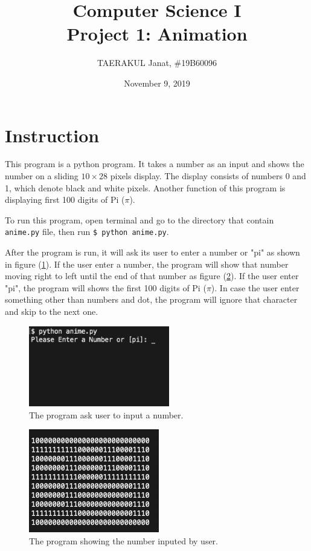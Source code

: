 \documentclass[12pt]{article}
\title{Computer Science I \\Project 1: Animation}
\author{TAERAKUL Janat, \#19B60096}
\date{November 9, 2019}
\begin{document}

\maketitle

\section{Instruction}\label{sec:instr}

	This program is a python program. It takes a number as an input and shows the number on a sliding $10 \times 28$ pixels display. The display consists of numbers 0 and 1, which denote black and white pixels. Another function of this program is displaying first 100 digits of Pi ($\pi$). 

	To run this program, open terminal and go to the directory that contain \texttt{anime.py} file, then run \texttt{\$ python anime.py}.

	After the program is run, it will ask its user to enter a number or "pi" as shown in figure (\ref{fig:runProg}). If the user enter a number, the program will show that number moving right to left until the end of that number as figure (\ref{fig:runningProg}). If the user enter "pi", the program will shows the first 100 digits of Pi ($\pi$). In case the user enter something other than numbers and dot, the program will ignore that character and skip to the next one.

	\begin{figure}[ht]
		\centering
		\includegraphics[height=3.5cm]{runProg.png}
		\caption{The program ask user to input a number.}
		\label{fig:runProg}
	\end{figure}	

	\begin{figure}[ht]
		\centering
		\includegraphics[height=4.5cm]{runningProg.png}
		\caption{The program showing the number inputed by user.}
		\label{fig:runningProg}
	\end{figure}
\end{document}

